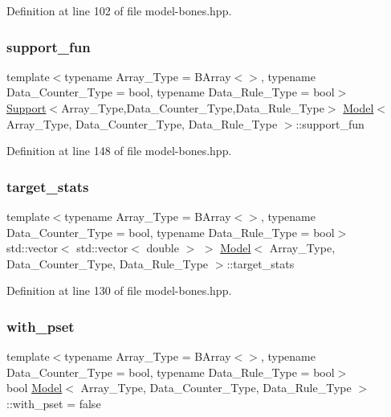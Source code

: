 Definition at line 102 of file model-\/bones.\+hpp.

\mbox{\label{class_model_aa9806f4bf7d9c935f37a31e67bbfbee4}} 
\subsubsection{\texorpdfstring{support\+\_\+fun}{support\_fun}}
{\footnotesize\ttfamily template$<$typename Array\+\_\+\+Type = B\+Array$<$$>$, typename Data\+\_\+\+Counter\+\_\+\+Type = bool, typename Data\+\_\+\+Rule\+\_\+\+Type = bool$>$ \\
\hyperlink{class_support}{Support}$<$Array\+\_\+\+Type,Data\+\_\+\+Counter\+\_\+\+Type,Data\+\_\+\+Rule\+\_\+\+Type$>$ \hyperlink{class_model}{Model}$<$ Array\+\_\+\+Type, Data\+\_\+\+Counter\+\_\+\+Type, Data\+\_\+\+Rule\+\_\+\+Type $>$\+::support\+\_\+fun}



Definition at line 148 of file model-\/bones.\+hpp.

\mbox{\label{class_model_a24ad6e57bff2297dcc7461609714f41b}} 
\subsubsection{\texorpdfstring{target\+\_\+stats}{target\_stats}}
{\footnotesize\ttfamily template$<$typename Array\+\_\+\+Type = B\+Array$<$$>$, typename Data\+\_\+\+Counter\+\_\+\+Type = bool, typename Data\+\_\+\+Rule\+\_\+\+Type = bool$>$ \\
std\+::vector$<$ std\+::vector$<$ double $>$ $>$ \hyperlink{class_model}{Model}$<$ Array\+\_\+\+Type, Data\+\_\+\+Counter\+\_\+\+Type, Data\+\_\+\+Rule\+\_\+\+Type $>$\+::target\+\_\+stats}



Definition at line 130 of file model-\/bones.\+hpp.

\mbox{\label{class_model_afd37924e6fcfdc30c9fc5ad56f1c4947}} 
\subsubsection{\texorpdfstring{with\+\_\+pset}{with\_pset}}
{\footnotesize\ttfamily template$<$typename Array\+\_\+\+Type = B\+Array$<$$>$, typename Data\+\_\+\+Counter\+\_\+\+Type = bool, typename Data\+\_\+\+Rule\+\_\+\+Type = bool$>$ \\
bool \hyperlink{class_model}{Model}$<$ Array\+\_\+\+Type, Data\+\_\+\+Counter\+\_\+\+Type, Data\+\_\+\+Rule\+\_\+\+Type $>$\+::with\+\_\+pset = false}



